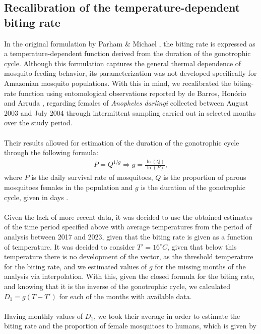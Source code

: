 \documentclass[a4paper,fleqn]{cas-dc}
\begin{document}
\subsection{Recalibration of the temperature-dependent biting rate}
\label{sec:recalibration_temp_dependent_biting_rate}
In the original formulation by Parham \& Michael \cite{Parham2010}, the biting rate is expressed as a temperature-dependent function derived from the duration of the gonotrophic cycle. Although this formulation captures the general thermal dependence of mosquito feeding behavior, its parameterization was not developed specifically for Amazonian mosquito populations. With this in mind, we recalibrated the biting-rate function using entomological observations reported by de Barros, Honório and Arruda \cite{debarros2011}, regarding females of \textit{Anopheles darlingi} collected between August 2003 and July 2004 through intermittent sampling carried out in selected months over the study period.
\\\\
Their results allowed for estimation of the duration of the gonotrophic cycle through the following formula:
\begin{align}
P=Q^{1/g} \Longrightarrow g = \frac{\ln(Q)}{\ln(P)},
\end{align}
where $P$ is the daily survival rate of mosquitoes, $Q$ is the proportion of parous mosquitoes females in the population and $g$ is the duration of the gonotrophic cycle, given in days \cite{duration_of_gonotrophic_cycle}.
\\\\
Given the lack of more recent data, it was decided to use the obtained estimates of the time period specified above with average temperatures from the period of analysis between 2017 and 2023, given that the biting rate is given as a function of temperature. It was decided to consider $T'=16^\circ C$, given that below this temperature there is no development of the vector, as the threshold temperature for the biting rate, and we estimated values of $g$ for the missing months of the analysis via interpolation. With this, given the closed formula for the biting rate, and knowing that it is the inverse of the gonotrophic cycle, we calculated $D_1= g(T-T')$ for each of the months with available data. %
\\\\
Having monthly values of $D_1$, we took their average in order to estimate the biting rate and the proportion of female mosquitoes to humans, which is given by
\end{document}
